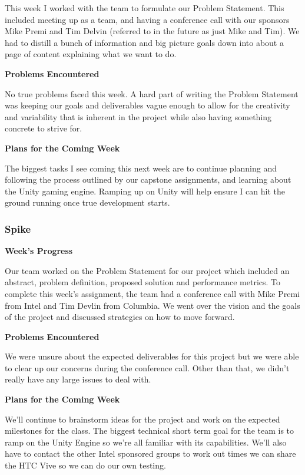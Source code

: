\documentclass[10pt,journal,compsoc,onecolumn, draftclsnofoot]{IEEEtran}
\begin{document}
This week I worked with the team to formulate our Problem Statement. This included meeting up as a team, and having a conference call with our sponsors Mike Premi and Tim Delvin (referred to in the future as just Mike and Tim). We had to distill a bunch of information and big picture goals down into about a page of content explaining what we want to do.

\noindent \textbf{Problems Encountered}

No true problems faced this week.  A hard part of writing the Problem Statement was keeping our goals and deliverables vague enough to allow for the creativity and variability that is inherent in the project while also having something concrete to strive for.

\noindent \textbf{Plans for the Coming Week}

The biggest tasks I see coming this next week are to continue planning and following the process outlined by our capstone assignments, and learning about the Unity gaming engine.  Ramping up on Unity will help ensure I can hit the ground running once true development starts.

\subsubsection{Spike}
\noindent \textbf{Week's Progress}

Our team worked on the Problem Statement for our project which included an abstract, problem definition, proposed solution and performance metrics. To complete this week's assignment, the team had a conference call with Mike Premi from Intel and Tim Devlin from Columbia. We went over the vision and the goals of the project and discussed strategies on how to move forward.

\noindent \textbf{Problems Encountered}

We were unsure about the expected deliverables for this project but we were able to clear up our concerns during the conference call. Other than that, we didn't really have any large issues to deal with.

\noindent \textbf{Plans for the Coming Week}

We'll continue to brainstorm ideas for the project and work on the expected milestones for the class. The biggest technical short term goal for the team is to ramp on the Unity Engine so we're all familiar with its capabilities. We'll also have to contact the other Intel sponsored groups to work out times we can share the HTC Vive so we can do our own testing.
\end{document}
